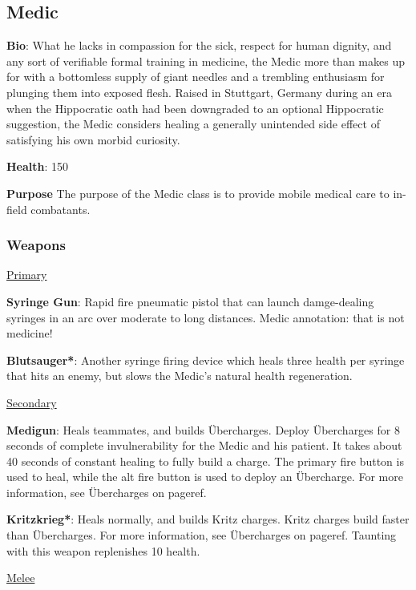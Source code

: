 \subsection{Medic}
{\bf Bio}:
What he lacks in compassion for the sick, respect for human dignity, and any sort of verifiable formal training in medicine, the Medic more than makes up for with a bottomless supply of giant needles and a trembling enthusiasm for plunging them into exposed flesh. Raised in Stuttgart, Germany during an era when the Hippocratic oath had been downgraded to an optional Hippocratic suggestion, the Medic considers healing a generally unintended side effect of satisfying his own morbid curiosity.

{\bf Health}: 150

{\bf Purpose}
The purpose of the Medic class is to provide mobile medical care to in-field combatants.  

\subsubsection {Weapons}

\begin {center}
\underline {Primary}
\end {center}

{\bf Syringe Gun}: Rapid fire pneumatic pistol that can launch damge-dealing syringes in an arc over moderate to long distances.  {{Medic annotation: that is not medicine!}}

{\bf Blutsauger*}: Another syringe firing device which heals three health per syringe that hits an enemy, but slows the Medic's natural health regeneration. 


\begin {center}
\underline {Secondary}
\end {center}

{\bf Medigun}: Heals teammates, and builds Übercharges. Deploy Übercharges for 8 seconds of complete invulnerability for the Medic and his patient. It takes about 40 seconds of constant healing to fully build a charge. The primary fire button is used to heal, while the alt fire button is used to deploy an Übercharge. For more information, see Übercharges on {{pageref}}. 

{\bf Kritzkrieg*}: Heals normally, and builds Kritz charges.  Kritz charges build faster than Übercharges.  For more information, see Übercharges on {{pageref}}.  Taunting with this weapon replenishes 10 health.


\begin {center}
\underline {Melee}
\end {center}


